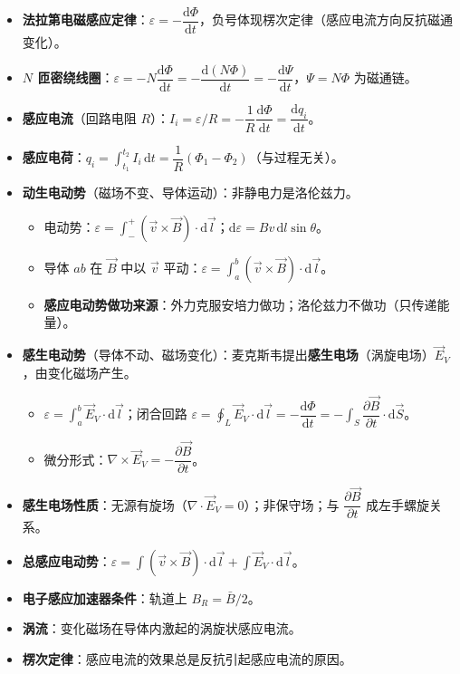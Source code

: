 \documentclass[12pt,a4paper]{ctexart}
\begin{document}
\begin{itemize}
    \item \textbf{法拉第电磁感应定律}：$\varepsilon=-\dfrac{\mathrm d\Phi}{\mathrm dt}$，负号体现楞次定律（感应电流方向反抗磁通变化）。
    \item \textbf{$N$ 匝密绕线圈}：$\varepsilon=-N\dfrac{\mathrm d\Phi}{\mathrm dt}=-\dfrac{\mathrm d(N\Phi)}{\mathrm dt}=-\dfrac{\mathrm d\Psi}{\mathrm dt}$，$\Psi=N\Phi$ 为磁通链。
    \item \textbf{感应电流}（回路电阻 $R$）：$I_i=\varepsilon/R=-\dfrac{1}{R}\dfrac{\mathrm d\Phi}{\mathrm dt}=\dfrac{\mathrm dq_i}{\mathrm dt}$。
    \item \textbf{感应电荷}：$q_i=\displaystyle\int_{t_1}^{t_2}I_i\,\mathrm dt=\dfrac{1}{R}(\Phi_1-\Phi_2)$（与过程无关）。
    \item \textbf{动生电动势}（磁场不变、导体运动）：非静电力是洛伦兹力。
    \begin{itemize}
        \item 电动势：$\varepsilon=\displaystyle\int_{-}^{+}(\vec v\times\vec B)\cdot\mathrm d\vec l$；$\mathrm d\varepsilon=Bv\,\mathrm dl\sin\theta$。
        \item 导体 $ab$ 在 $\vec B$ 中以 $\vec v$ 平动：$\varepsilon=\displaystyle\int_a^b(\vec v\times\vec B)\cdot\mathrm d\vec l$。
        \item \textbf{感应电动势做功来源}：外力克服安培力做功；洛伦兹力不做功（只传递能量）。
    \end{itemize}
    \item \textbf{感生电动势}（导体不动、磁场变化）：麦克斯韦提出\textbf{感生电场}（涡旋电场）$\vec E_V$，由变化磁场产生。
    \begin{itemize}
        \item $\varepsilon=\displaystyle\int_a^b\vec E_V\cdot\mathrm d\vec l$；闭合回路 $\varepsilon=\displaystyle\oint_L\vec E_V\cdot\mathrm d\vec l=-\dfrac{\mathrm d\Phi}{\mathrm dt}=-\displaystyle\int_S\dfrac{\partial\vec B}{\partial t}\cdot\mathrm d\vec S$。
        \item 微分形式：$\nabla\times\vec E_V=-\dfrac{\partial\vec B}{\partial t}$。
    \end{itemize}
    \item \textbf{感生电场性质}：无源有旋场（$\nabla\cdot\vec E_V=0$）；非保守场；与 $\dfrac{\partial\vec B}{\partial t}$ 成左手螺旋关系。
    \item \textbf{总感应电动势}：$\varepsilon=\displaystyle\int(\vec v\times\vec B)\cdot\mathrm d\vec l+\int\vec E_V\cdot\mathrm d\vec l$。
    \item \textbf{电子感应加速器条件}：轨道上 $B_R=\bar B/2$。
    \item \textbf{涡流}：变化磁场在导体内激起的涡旋状感应电流。
    \item \textbf{楞次定律}：感应电流的效果总是反抗引起感应电流的原因。
\end{itemize}
\end{document}
